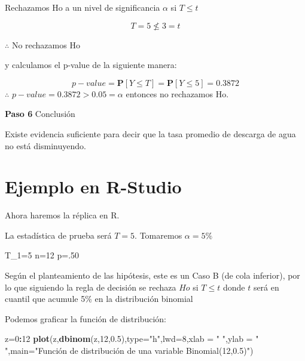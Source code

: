 \documentclass[a4paper,oneside,openany]{book}
\newenvironment{Shaded}{\begin{snugshade}}{\end{snugshade}}
\newcommand{\KeywordTok}[1]{\textcolor[rgb]{0.13,0.29,0.53}{\textbf{#1}}}
\newcommand{\DataTypeTok}[1]{\textcolor[rgb]{0.13,0.29,0.53}{#1}}
\newcommand{\DecValTok}[1]{\textcolor[rgb]{0.00,0.00,0.81}{#1}}
\newcommand{\FloatTok}[1]{\textcolor[rgb]{0.00,0.00,0.81}{#1}}
\newcommand{\StringTok}[1]{\textcolor[rgb]{0.31,0.60,0.02}{#1}}
\newcommand{\OperatorTok}[1]{\textcolor[rgb]{0.81,0.36,0.00}{\textbf{#1}}}
\newcommand{\NormalTok}[1]{#1}
\begin{document}
Rechazamos Ho a un nivel de significancia \(\alpha\) si \(T \leq t\)

\[T=5 \nleq 3=t\]

\(\therefore\) No rechazamos Ho

y calculamos el p-value de la siguiente manera:

\[p-value=\mathbf{P}[Y\leq T]=\mathbf{P}[Y\leq 5]=0.3872\]
\(\therefore\) \(p-value=0.3872>0.05=\alpha\) entonces no rechazamos Ho.

\textbf{Paso 6} Conclusión

Existe evidencia suficiente para decir que la tasa promedio de descarga
de agua no está disminuyendo.

\section{Ejemplo en R-Studio}\label{ejemplo-en-r-studio-4}

Ahora haremos la réplica en R.

La estadística de prueba será \(T=5\). Tomaremos \(\alpha=5\%\)

\begin{Shaded}
\begin{Highlighting}[]
\NormalTok{T_}\DecValTok{1}\NormalTok{=}\DecValTok{5}
\NormalTok{n=}\DecValTok{12}
\NormalTok{p=.}\DecValTok{50}
\end{Highlighting}
\end{Shaded}

Según el planteamiento de las hipótesis, este es un Caso B (de cola
inferior), por lo que siguiendo la regla de decisión se rechaza \(Ho\)
si \(T\leq t\) donde \(t\) será en cuantil que acumule 5\% en la
distribución binomial

Podemos graficar la función de distribución:

\begin{Shaded}
\begin{Highlighting}[]
\NormalTok{z=}\DecValTok{0}\OperatorTok{:}\DecValTok{12}
\KeywordTok{plot}\NormalTok{(z,}\KeywordTok{dbinom}\NormalTok{(z,}\DecValTok{12}\NormalTok{,}\FloatTok{0.5}\NormalTok{),}\DataTypeTok{type=}\StringTok{"h"}\NormalTok{,}\DataTypeTok{lwd=}\DecValTok{8}\NormalTok{,}\DataTypeTok{xlab =} \StringTok{" "}\NormalTok{,}\DataTypeTok{ylab =} \StringTok{" "}\NormalTok{,}\DataTypeTok{main=}\StringTok{"Función de distribución de una variable Binomial(12,0.5)"}\NormalTok{)}
\end{Highlighting}
\end{Shaded}
\end{document}
